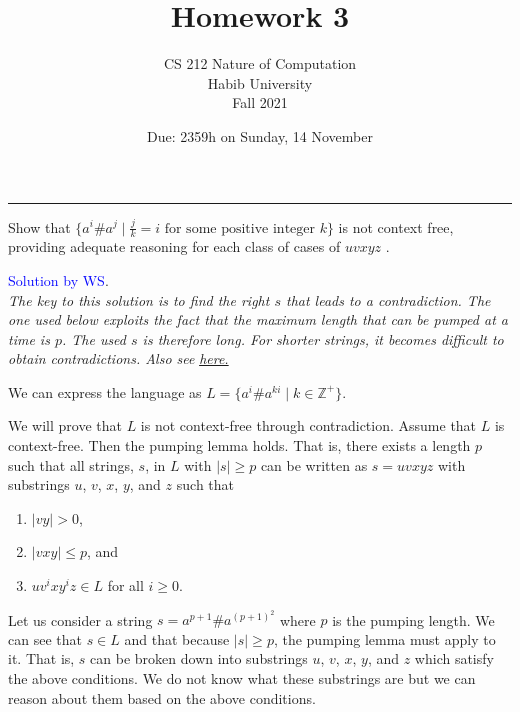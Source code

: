 \documentclass[a4page]{exam}
\title{Homework 3}
\author{CS 212 Nature of Computation\\Habib University\\Fall 2021}
\date{Due: 2359h on Sunday, 14 November}
\begin{document}
\maketitle
\thispagestyle{empty}

\noindent\rule{\textwidth}{1pt}

\begin{questions}
\question[20] Show that $\{a^i\#a^j \mid \frac{j}{k} = i \text{ for some positive integer } k\}$ is not context free, providing adequate reasoning for each class of cases of $uvxyz$ .

  \begin{solution}
    \textcolor{blue}{Solution by WS}.\\
    \textit{The key to this solution is to find the right $s$ that leads to a contradiction. The one used below exploits the fact that the maximum length that can be pumped at a time is $p$. The used $s$ is therefore long. For shorter strings, it becomes difficult to obtain contradictions. Also see }\href{https://math.stackexchange.com/questions/1971391/prove-that-f-ai-bj-mid-i-kj-text-for-some-positive-integer-k#comment4048973_1971397}{\textit{here.}}
    
    We can express the language as $L = \{a^i\#a^{ki} \mid k \in \mathbb{Z}^+\}$.

    We will prove that $L$ is not context-free through contradiction. Assume that $L$ is context-free. Then the pumping lemma holds. That is, there exists a length $p$ such that all strings, $s$, in $L$ with $|s| \geq p$ can be written as $s = uvxyz$ with substrings $u$, $v$, $x$, $y$, and $z$ such that
    \begin{enumerate}
    \item $|vy| > 0$,
    \item $|vxy| \leq p$, and
    \item $uv^ixy^iz \in L$ for all $i\geq 0$.
    \end{enumerate}

    Let us consider a string $s = a^{p+1}\#a^{(p+1)^2}$ where $p$ is the pumping length. We can see that $s\in L$ and that because $|s|\geq p$, the pumping lemma must apply to it. That is, $s$ can be broken down into substrings $u$, $v$, $x$, $y$, and $z$ which satisfy the above conditions. We do not know what these substrings are but we can reason about them based on the above conditions.
    

\end{solution}
\end{questions}
\end{document}
